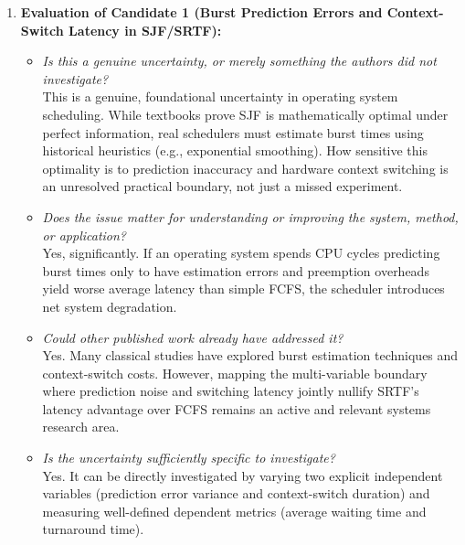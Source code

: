 \documentclass[11pt]{article}
\begin{document}
\begin{enumerate}[leftmargin=1.5em]

    \item \textbf{Evaluation of Candidate 1 (Burst Prediction Errors and Context-Switch Latency in SJF/SRTF):}
    \begin{itemize}[leftmargin=1.2em]
        \item \textit{Is this a genuine uncertainty, or merely something the authors did not investigate?} \\
        This is a genuine, foundational uncertainty in operating system scheduling. While textbooks prove SJF is mathematically optimal under perfect information, real schedulers must estimate burst times using historical heuristics (e.g., exponential smoothing). How sensitive this optimality is to prediction inaccuracy and hardware context switching is an unresolved practical boundary, not just a missed experiment.
        \item \textit{Does the issue matter for understanding or improving the system, method, or application?} \\
        Yes, significantly. If an operating system spends CPU cycles predicting burst times only to have estimation errors and preemption overheads yield worse average latency than simple FCFS, the scheduler introduces net system degradation.
        \item \textit{Could other published work already have addressed it?} \\
        Yes. Many classical studies have explored burst estimation techniques and context-switch costs. However, mapping the multi-variable boundary where prediction noise and switching latency jointly nullify SRTF's latency advantage over FCFS remains an active and relevant systems research area.
        \item \textit{Is the uncertainty sufficiently specific to investigate?} \\
        Yes. It can be directly investigated by varying two explicit independent variables (prediction error variance and context-switch duration) and measuring well-defined dependent metrics (average waiting time and turnaround time).
    \end{itemize}


\end{enumerate}
\end{document}
